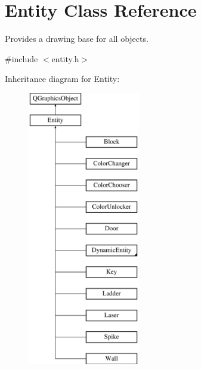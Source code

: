 \hypertarget{class_entity}{}\section{Entity Class Reference}
\label{class_entity}


Provides a drawing base for all objects.  




{\ttfamily \#include $<$entity.\+h$>$}

Inheritance diagram for Entity\+:\begin{figure}[H]
\begin{center}
\leavevmode
\includegraphics[height=12.000000cm]{class_entity}
\end{center}
\end{figure}
